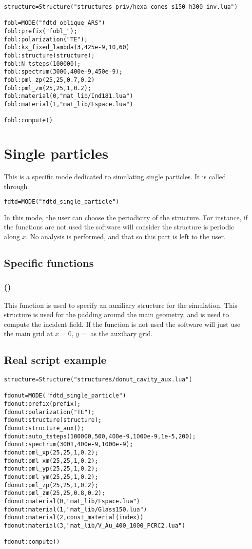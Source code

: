 \begin{lstlisting}
structure=Structure("structures_priv/hexa_cones_s150_h300_inv.lua")

fobl=MODE("fdtd_oblique_ARS")
fobl:prefix("fobl_");
fobl:polarization("TE");
fobl:kx_fixed_lambda(3,425e-9,10,60)
fobl:structure(structure);
fobl:N_tsteps(100000);
fobl:spectrum(3000,400e-9,450e-9);
fobl:pml_zp(25,25,0.7,0.2)
fobl:pml_zm(25,25,1,0.2);
fobl:material(0,"mat_lib/Ind181.lua")
fobl:material(1,"mat_lib/Fspace.lua")

fobl:compute()
\end{lstlisting}

\section{Single particles}

This is a specific mode dedicated to simulating single particles. It is called through
\begin{lstlisting}
fdtd=MODE("fdtd_single_particle")
\end{lstlisting}
In this mode, the user can choose the periodicity of the structure. For instance, if the  functions are not used the software will consider the structure is periodic along $x$. No analysis is performed, and that so this part is left to the user.


\subsection{Specific functions}


\subsubsection[structure\_aux]{()}

This function is used to specify an auxiliary structure for the simulation. This structure is used for the padding around the main geometry, and is used to compute the incident field. If the function is not used the software will just use the main grid at $x=0$, $y=$ as the auxiliary grid.

\subsection{Real script example}

\begin{lstlisting}
structure=Structure("structures/donut_cavity_aux.lua")

fdonut=MODE("fdtd_single_particle")
fdonut:prefix(prefix);
fdonut:polarization("TE");
fdonut:structure(structure);
fdonut:structure_aux();
fdonut:auto_tsteps(100000,500,400e-9,1000e-9,1e-5,200);
fdonut:spectrum(3001,400e-9,1000e-9);
fdonut:pml_xp(25,25,1,0.2);
fdonut:pml_xm(25,25,1,0.2);
fdonut:pml_yp(25,25,1,0.2);
fdonut:pml_ym(25,25,1,0.2);
fdonut:pml_zp(25,25,1,0.2);
fdonut:pml_zm(25,25,0.8,0.2);
fdonut:material(0,"mat_lib/Fspace.lua")
fdonut:material(1,"mat_lib/Glass150.lua")
fdonut:material(2,const_material(index))
fdonut:material(3,"mat_lib/V_Au_400_1000_PCRC2.lua")

fdonut:compute()
\end{lstlisting}





	
